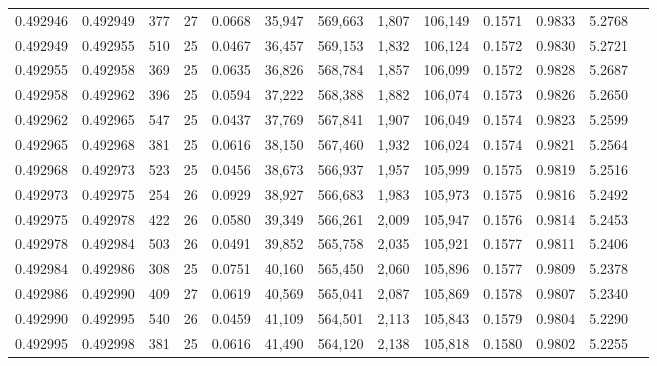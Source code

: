 \begin{tabular}{rrrrrrrrrrrrr}
0.492946 & 0.492949 & 377 &  27 &                                     0.0668 &  35,947 & 569,663 &   1,807 & 106,149 & 0.1571 & 0.9833 & 5.2768 \\
0.492949 & 0.492955 & 510 &  25 &                                     0.0467 &  36,457 & 569,153 &   1,832 & 106,124 & 0.1572 & 0.9830 & 5.2721 \\
0.492955 & 0.492958 & 369 &  25 &                                     0.0635 &  36,826 & 568,784 &   1,857 & 106,099 & 0.1572 & 0.9828 & 5.2687 \\
0.492958 & 0.492962 & 396 &  25 &                                     0.0594 &  37,222 & 568,388 &   1,882 & 106,074 & 0.1573 & 0.9826 & 5.2650 \\
0.492962 & 0.492965 & 547 &  25 &                                     0.0437 &  37,769 & 567,841 &   1,907 & 106,049 & 0.1574 & 0.9823 & 5.2599 \\
0.492965 & 0.492968 & 381 &  25 &                                     0.0616 &  38,150 & 567,460 &   1,932 & 106,024 & 0.1574 & 0.9821 & 5.2564 \\
0.492968 & 0.492973 & 523 &  25 &                                     0.0456 &  38,673 & 566,937 &   1,957 & 105,999 & 0.1575 & 0.9819 & 5.2516 \\
0.492973 & 0.492975 & 254 &  26 &                                     0.0929 &  38,927 & 566,683 &   1,983 & 105,973 & 0.1575 & 0.9816 & 5.2492 \\
0.492975 & 0.492978 & 422 &  26 &                                     0.0580 &  39,349 & 566,261 &   2,009 & 105,947 & 0.1576 & 0.9814 & 5.2453 \\
0.492978 & 0.492984 & 503 &  26 &                                     0.0491 &  39,852 & 565,758 &   2,035 & 105,921 & 0.1577 & 0.9811 & 5.2406 \\
0.492984 & 0.492986 & 308 &  25 &                                     0.0751 &  40,160 & 565,450 &   2,060 & 105,896 & 0.1577 & 0.9809 & 5.2378 \\
0.492986 & 0.492990 & 409 &  27 &                                     0.0619 &  40,569 & 565,041 &   2,087 & 105,869 & 0.1578 & 0.9807 & 5.2340 \\
0.492990 & 0.492995 & 540 &  26 &                                     0.0459 &  41,109 & 564,501 &   2,113 & 105,843 & 0.1579 & 0.9804 & 5.2290 \\
0.492995 & 0.492998 & 381 &  25 &                                     0.0616 &  41,490 & 564,120 &   2,138 & 105,818 & 0.1580 & 0.9802 & 5.2255 \\

\end{tabular}
